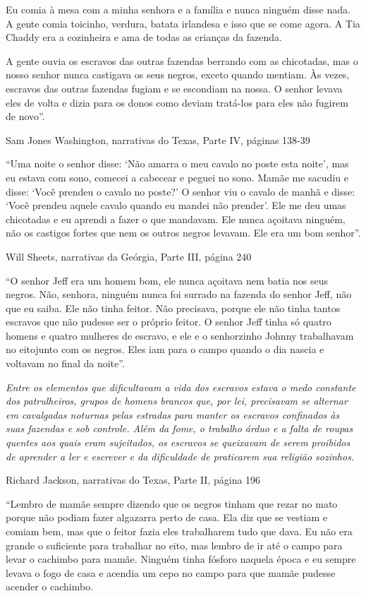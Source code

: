 Eu comia à mesa com a minha senhora e a família e nunca ninguém disse
nada. A gente comia toicinho, verdura, batata irlandesa e isso que se
come agora. A Tia Chaddy era a cozinheira e ama de todas as crianças da
fazenda.

A gente ouvia os escravos das outras fazendas berrando com as
chicotadas, mas o nosso senhor nunca castigava os seus negros, exceto
quando mentiam. Às vezes, escravos das outras fazendas fugiam e se
escondiam na nossa. O senhor levava eles de volta e dizia para os donos
como deviam tratá-los para eles não fugirem de novo''.

Sam Jones Washington, narrativas do Texas, Parte IV, páginas 138-39

``Uma noite o senhor disse: `Não amarra o meu cavalo no poste esta
noite', mas eu estava com sono, comecei a cabecear e peguei no sono.
Mamãe me sacudiu e disse: `Você prendeu o cavalo no poste?' O senhor viu
o cavalo de manhã e disse: `Você prendeu aquele cavalo quando eu mandei
não prender'. Ele me deu umas chicotadas e eu aprendi a fazer o que
mandavam. Ele nunca açoitava ninguém, não os castigos fortes que nem os
outros negros levavam. Ele era um bom senhor''.

Will Sheets, narrativas da Geórgia, Parte III, página 240

``O senhor Jeff era um homem bom, ele nunca açoitava nem batia nos seus
negros. Não, senhora, ninguém nunca foi surrado na fazenda do senhor
Jeff, não que eu saiba. Ele não tinha feitor. Não precisava, porque ele
não tinha tantos escravos que não pudesse ser o próprio feitor. O senhor
Jeff tinha só quatro homens e quatro mulheres de escravo, e ele e o
senhorzinho Johnny trabalhavam no eitojunto com os negros. Eles iam para
o campo quando o dia nascia e voltavam no final da noite''.

\emph{Entre os elementos que dificultavam a vida dos escravos estava o
medo constante dos patrulheiros, grupos de homens brancos que, por lei,
precisavam se alternar em cavalgadas noturnas pelas estradas para manter
os escravos confinados às suas fazendas e sob controle. Além da fome, o
trabalho árduo e a falta de roupas quentes aos quais eram sujeitados, os
escravos se queixavam de serem proibidos de aprender a ler e escrever e
da dificuldade de praticarem sua religião sozinhos.}

Richard Jackson, narrativas do Texas, Parte II, página 196

``Lembro de mamãe sempre dizendo que os negros tinham que rezar no mato
porque não podiam fazer algazarra perto de casa. Ela diz que se vestiam
e comiam bem, mas que o feitor fazia eles trabalharem tudo que dava. Eu
não era grande o suficiente para trabalhar no eito, mas lembro de ir até
o campo para levar o cachimbo para mamãe. Ninguém tinha fósforo naquela
época e eu sempre levava o fogo de casa e acendia um cepo no campo para
que mamãe pudesse acender o cachimbo.

